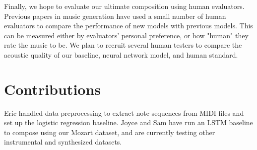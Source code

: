\documentclass[twoside,twocolumn]{article}
\begin{document}
Finally, we hope to evaluate our ultimate composition using human evaluators. Previous papers in music generation have used a small number of human evaluators to compare the performance of new models with previous models. This can be measured either by evaluators' personal preference, or how "human" they rate the music to be. We plan to recruit several human testers to compare the acoustic quality of our baseline, neural network model, and human standard.



\section{Contributions}

Eric handled data preprocessing to extract note sequences from MIDI files and set up the logistic regression baseline. Joyce and Sam have run an LSTM baseline to compose using our Mozart dataset, and are currently testing other instrumental and synthesized datasets.






\end{document}
